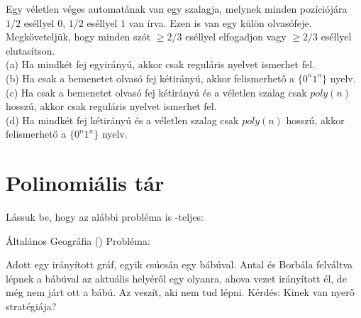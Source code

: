 \begin{Exercise}[counter={sorszam}, difficulty=0]
Egy véletlen véges automatának van egy szalagja, melynek minden pozíciójára $1/2$ eséllyel $0$, $1/2$ eséllyel $1$ van írva. Ezen is van egy külön olvasófeje. Megköveteljük, hogy minden szót $\ge 2/3$ eséllyel elfogadjon vagy $\ge 2/3$ eséllyel elutasítson.\\
(a) Ha mindkét fej egyirányú, akkor csak reguláris nyelvet ismerhet fel.\\
(b) Ha csak a bemenetet olvasó fej kétirányú, akkor felismerhető a $\{0^n1^n\}$ nyelv.\\
(c) Ha csak a bemenetet olvasó fej kétirányú és a véletlen szalag csak $poly(n)$ hosszú, akkor csak reguláris nyelvet ismerhet fel.\\
(d) Ha mindkét fej kétirányú és a véletlen szalag csak $poly(n)$ hosszú, akkor felismerhető a $\{0^n1^n\}$ nyelv.

\end{Exercise}



\chapter{Polinomiális tár}


\begin{Exercise}[counter={sorszam}, difficulty=0]
Lássuk be, hogy az alábbi probléma is \PSPACE-teljes:

Általános Geográfia () Probléma:

Adott egy irányított gráf, egyik csúcsán egy bábúval. Antal és Borbála
felváltva lépnek a bábúval az aktuális helyéről egy olyanra, ahova vezet
irányított él, de még nem járt ott a bábú. Az veszít, aki nem tud lépni.
Kérdés: Kinek van nyerő stratégiája?
\end{Exercise}


